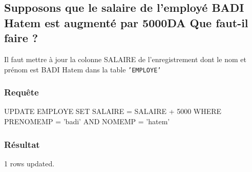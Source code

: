 \documentclass[•]{article}
\begin{document}
\subsection{Supposons que le salaire de l’employé BADI Hatem est augmenté par 5000DA Que faut-il faire ?}
\textrm{Il faut mettre à jour la colonne SALAIRE de l'enregistrement dont le nom et prénom est BADI Hatem dans la table \texttt{'EMPLOYE'} }
\subsubsection{Requête}
\begin{sql}
UPDATE EMPLOYE SET SALAIRE = SALAIRE + 5000 WHERE PRENOMEMP = 'badi' AND NOMEMP = 'hatem'    
\end{sql}
\subsubsection{Résultat}
\begin{sql}
1 rows updated.
\end{sql}
\end{document}
